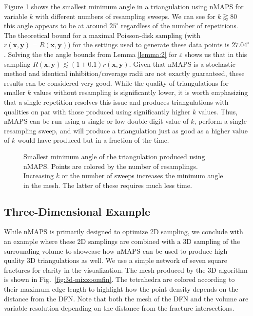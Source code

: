\documentclass[preprint, 10pt]{elsarticle}
\newcommand{\vx}{{\mathbf x}}
\newcommand{\vy}{{\mathbf y}}
\theoremstyle{definition}
\theoremstyle{remark}
\begin{document}
Figure \ref{fig:k_ang} shows the smallest minimum angle in a triangulation using nMAPS for variable $k$ with different numbers of resampling sweeps. 
We can see for $k\gtrapprox 80$ this angle appears to be at around $25^\circ$ regardless of the number of repetitions. 
The theoretical bound for a maximal Poisson-disk sampling (with $r(\vx,\vy)=R(\vx,\vy )$) for the settings used to generate these data points is $27.04^\circ$.
Solving the the angle bounds from Lemma \ref{lemma:2} for $\varepsilon$ shows us that in this sampling $R(\vx,\vy)\lesssim (1+0.1)r(\vx,\vy)$.
Given that nMAPS is a stochastic method and identical inhibition/coverage radii are not exactly guaranteed, these results can be considered very good.
While the quality of triangulations for smaller $k$ values without resampling is significantly lower, it is worth emphasizing that a single repetition resolves this issue and produces triangulations with qualities on par with those produced using significantly higher $k$ values. 
Thus, nMAPS can be run using a single or low double-digit value of $k$, perform a single resampling sweep, and will produce a triangulation just as good as a higher value of $k$ would have produced but in a fraction of the time.

%	
\begin{figure}
	\centering
	
	\caption{Smallest minimum angle of the triangulation produced using nMAPS. Points are colored by the number of resamplings. Increasing $k$ or the number of sweeps increases the minimum angle in the mesh. The latter of these requires much less time.}
	\label{fig:k_ang}
\end{figure}


\subsection{Three-Dimensional Example}

While nMAPS is primarily designed to optimize 2D sampling, we conclude with an example where these 2D samplings are combined with a 3D sampling of the surrounding volume to showcase how nMAPS can be used to produce high-quality 3D triangulations as well.
We use a simple network of seven square fractures for clarity in the visualization. 
The mesh produced by the 3D algorithm is shown in Fig.~\ref{fig:3d-mixzoomfin}. 
The tetrahedra are colored according to their maximum edge length to highlight how the point density depends on the distance from the DFN. 
Note that both the mesh of the DFN and the volume are variable resolution depending on the distance from the fracture intersections.
\end{document}
